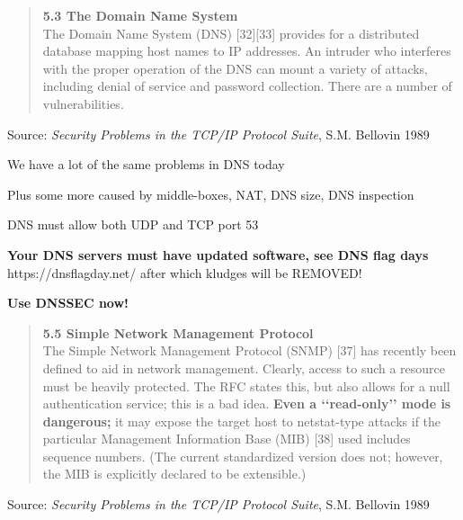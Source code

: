 \documentclass[Screen16to9,17pt]{foils}
\begin{document}

\begin{quote}
{\bf 5.3 The Domain Name System}\\
The Domain Name System (DNS) [32][33] provides for a distributed database mapping host names to IP addresses. An intruder who interferes with the proper operation of the DNS can mount a variety of attacks, including denial of service and password collection. There are a number of vulnerabilities.
\end{quote}
Source: \emph{Security Problems in the TCP/IP Protocol Suite}, S.M. Bellovin 1989\\

\begin{list1}
\item We have a lot of the same problems in DNS today
\item Plus some more caused by middle-boxes, NAT, DNS size, DNS inspection
\begin{list2}
\item DNS must allow both UDP and TCP port 53
\item {\bf Your DNS servers must have updated software, see DNS flag days}\\ https://dnsflagday.net/ after which kludges will be REMOVED!
\item {\bf Use DNSSEC now!}
\end{list2}
\end{list1}


\begin{quote}
{\bf 5.5 Simple Network Management Protocol}\\
The Simple Network Management Protocol (SNMP) [37] has recently been defined to aid in network management. Clearly, access to such a resource must be heavily protected. The RFC states this, but also allows for a null authentication service; this is a bad idea. {\bf Even a ‘‘read-only’’ mode is dangerous;} it may expose the target host to netstat-type attacks if the particular Management Information Base (MIB) [38] used includes sequence numbers. (The current standardized version does not; however, the MIB is explicitly declared to be extensible.)
\end{quote}
Source: \emph{Security Problems in the TCP/IP Protocol Suite}, S.M. Bellovin 1989\\
\end{document}
